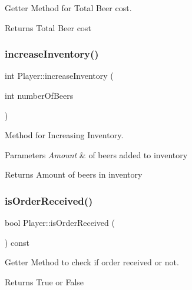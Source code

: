 Getter Method for Total Beer cost. 

\begin{DoxyReturn}{Returns}
Total Beer cost 
\end{DoxyReturn}
\mbox{\label{classPlayer_af67e6ee0de38f3e9635d35849f103449}} 
\subsubsection{\texorpdfstring{increase\+Inventory()}{increaseInventory()}}
{\footnotesize\ttfamily int Player\+::increase\+Inventory (\begin{DoxyParamCaption}\item[{int}]{number\+Of\+Beers }\end{DoxyParamCaption})}



Method for Increasing Inventory. 


\begin{DoxyParams}{Parameters}
{\em Amount} & of beers added to inventory \\
\hline
\end{DoxyParams}
\begin{DoxyReturn}{Returns}
Amount of beers in inventory 
\end{DoxyReturn}
\mbox{\label{classPlayer_a5be8afcdfb75792e300d9c255d058a05}} 
\subsubsection{\texorpdfstring{is\+Order\+Received()}{isOrderReceived()}}
{\footnotesize\ttfamily bool Player\+::is\+Order\+Received (\begin{DoxyParamCaption}{ }\end{DoxyParamCaption}) const}



Getter Method to check if order received or not. 

\begin{DoxyReturn}{Returns}
True or False 
\end{DoxyReturn}
\mbox{\label{classPlayer_ad3834057ec43f27a631d24f276586265}} 
